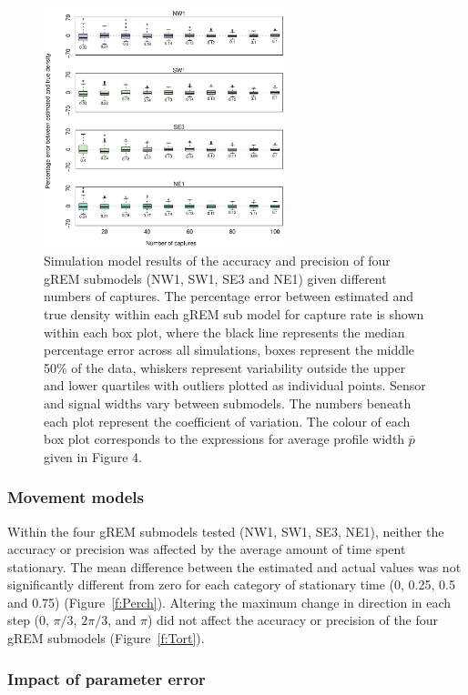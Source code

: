\documentclass[a4paper,10pt,reqno,oneside]{amsart}
\begin{document}
\begin{figure}[t]
       \centering
	\includegraphics[width=7cm]{imgs/ResultsNoCaptures.pdf}
        \caption{Simulation model results of the accuracy and precision of four gREM submodels (NW1, SW1, SE3 and NE1) given different numbers of captures. The percentage error between estimated and true density within each gREM sub model for capture rate is shown within each box plot, where the black line represents the median percentage error across all simulations, boxes represent the middle 50\% of the data, whiskers represent variability outside the upper and lower quartiles with outliers plotted as individual points. Sensor and signal widths vary between submodels. The numbers beneath each plot represent the coefficient of variation. The colour of each box plot corresponds to the expressions for average profile width $\bar{p}$ given in Figure 4. }            
	\label{f:Captures}
\end{figure}


\subsubsection*{Movement models}

Within the four gREM submodels tested (NW1, SW1, SE3, NE1), neither the accuracy or precision was affected by the average amount of time spent stationary. The mean difference between the estimated and actual values was not significantly different from zero for each category of stationary time (0, 0.25, 0.5 and 0.75) (Figure~\ref{f:Perch}). Altering the maximum change in direction in each step (0, $\pi/3$, $2\pi/3$, and $\pi$) did not affect the accuracy or precision of the four gREM submodels (Figure~\ref{f:Tort}). 

\subsubsection*{Impact of parameter error}
\end{document}
